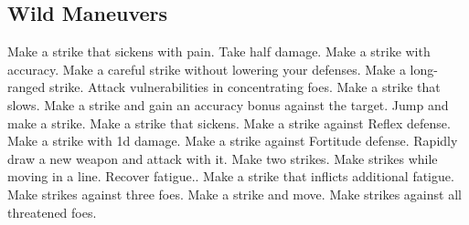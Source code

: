 \small
\subsection{Wild Maneuvers}\label{Wild Maneuvers}
\begin{spelllist}
 Make a strike that sickens with pain.
 Take half damage.
 Make a strike with  accuracy.
 Make a careful strike without lowering your defenses.
 Make a long-ranged strike.
 Attack vulnerabilities in concentrating foes.
 Make a strike that slows.
 Make a strike and gain an accuracy bonus against the target.
 Jump and make a strike.
 Make a strike that sickens.
 Make a strike against Reflex defense.
 Make a strike with \plus1d damage.
 Make a strike against Fortitude defense.
 Rapidly draw a new weapon and attack with it.
 Make two strikes.
 Make strikes while moving in a line.
 Recover fatigue..
 Make a strike that inflicts additional fatigue.
 Make strikes against three foes.
 Make a strike and move.
 Make strikes against all threatened foes.
\end{spelllist}
